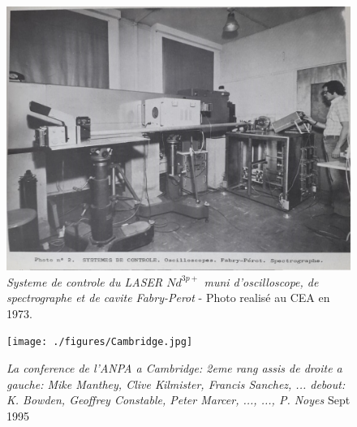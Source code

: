 \documentclass[a4paper,12pt]{article}
\begin{document}
\begin{appendix}
\begin{figure}
\centering
\includegraphics[width=14.5cm,height=8.6cm]{./figures/ControlSystemOscilloFabryPerot-CEA-multiphotonGroup.jpg}
\caption[Vue du systeme de controle du LASER $Nd^{3p+}$]{\textit{Systeme de controle du LASER $Nd^{3p+}$ muni d'oscilloscope, de spectrographe et de cavite Fabry-Perot} - Photo realisé au CEA en 1973.} 
\label{fig:10:figure10}
\end{figure}


\begin{figure}
\centering
\texttt{[image: ./figures/Cambridge.jpg]}
\caption[La conference de l'ANPA a Cambridge en 1995]{\textit{La conference de l'ANPA a Cambridge: 2eme rang assis de droite a gauche: Mike Manthey, Clive Kilmister, Francis Sanchez, ... debout: K. Bowden, Geoffrey Constable, Peter Marcer, ..., ..., P. Noyes} Sept 1995 }
\label{fig:11:figure11}
\end{figure}



\end{appendix}
\end{document}
